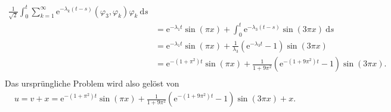 \begin{solution}
\begin{itemize}
\begin{align*}
        \frac{1}{\sqrt{2}}\int_0^t \sum_{k = 1}^\infty
        \mathrm{e}^{-\lambda_k (t-s)}(\varphi_3, \varphi_k) \varphi_k \mathrm{~d} s\\
        &= \mathrm{e}^{-\lambda_1 t} \sin(\pi x) + \int_0^t \mathrm{e}^{-\lambda_3(t-s)} \sin(3\pi x) \mathrm{~d} s \\
        &= \mathrm{e}^{-\lambda_1 t} \sin(\pi x) + \frac{1}{\lambda_3}
        (\mathrm{e}^{-\lambda_3 t} - 1) \sin(3\pi x) \\
        &= \mathrm{e}^{-(1+\pi^2)t} \sin(\pi x) + \frac{1}{1+9\pi^2}
        (\mathrm{e}^{-(1+9\pi^2) t} - 1) \sin(3\pi x). \\
    \end{align*}
    Das ursprüngliche Problem wird also gelöst von
    \begin{align*}
        u = v + x = \mathrm{e}^{-(1+\pi^2)t} \sin(\pi x) + \frac{1}{1+9\pi^2}
        (\mathrm{e}^{-(1+9\pi^2) t} - 1) \sin(3\pi x) + x.
    \end{align*}
    \end{itemize}


\end{solution}

